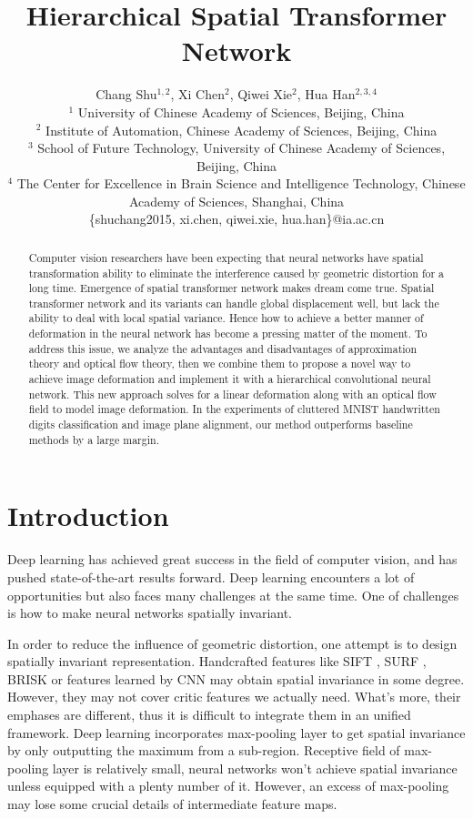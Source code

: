 \documentclass{article}
\title{Hierarchical Spatial Transformer Network}
\author{
Chang Shu$^{1,2}$,
Xi Chen$^{2}$,
Qiwei Xie$^{2}$,
Hua Han$^{2,3,4}$
\\
$^{1}$ University of Chinese Academy of Sciences, Beijing, China \\
$^{2}$ Institute of Automation, Chinese Academy of Sciences, Beijing, China\\
$^{3}$ School of Future Technology, University of Chinese Academy of Sciences, Beijing, China  \\
$^{4}$ The Center for Excellence in Brain Science and Intelligence Technology, Chinese Academy of Sciences, Shanghai, China\\
\{shuchang2015, xi.chen, qiwei.xie, hua.han\}@ia.ac.cn
}
\begin{document}
\maketitle

\begin{abstract}
Computer vision researchers have been expecting that neural networks have spatial transformation ability to eliminate the interference caused by geometric distortion for a long time.
Emergence of spatial transformer network makes dream come true.
Spatial transformer network and its variants can handle global displacement well, but lack the ability to deal with local spatial variance.
Hence how to achieve a better manner of deformation in the neural network has become a pressing matter of the moment.
To address this issue, we analyze the advantages and disadvantages of approximation theory and optical flow theory, then we combine them to propose a novel way to achieve image deformation and implement it with a hierarchical convolutional neural network.
This new approach solves for a linear deformation along with an optical flow field to model image deformation.
In the experiments of cluttered MNIST handwritten digits classification and image plane alignment, our method outperforms baseline methods by a large margin.
\end{abstract}

\section{Introduction}
Deep learning has achieved great success in the field of computer vision, and has pushed state-of-the-art results forward.
Deep learning encounters a lot of opportunities but also faces many challenges at the same time.
One of challenges is how to make neural networks spatially invariant.

In order to reduce the influence of geometric distortion, one attempt is to design spatially invariant representation.
Handcrafted features like SIFT \cite{Lowe2004Distinctive}, SURF \cite{Bay2008Speeded}, BRISK \cite{Leutenegger2011BRISK} or features learned by CNN \cite{Bruna2012Invariant,Angjoo2014Locally,Sohn2012Learning,Stollenga2014Deep} may obtain spatial invariance in some degree.
However, they may not cover critic features we actually need.
What's more, their emphases are different, thus it is difficult to integrate them in an unified framework.
Deep learning incorporates max-pooling layer to get spatial invariance by only outputting the maximum from a sub-region.
Receptive field of max-pooling layer is relatively small, neural networks won't achieve spatial invariance unless equipped with a plenty number of it.
However, an excess of max-pooling may lose some crucial details of intermediate feature maps.
\end{document}
